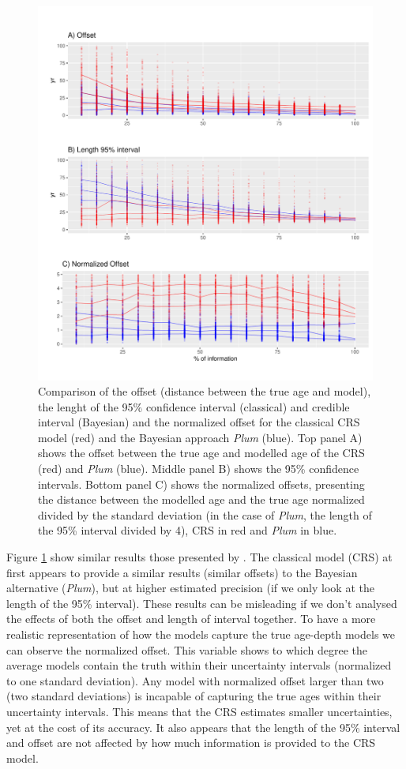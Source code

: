 \documentclass [10pt] {article}
\begin{document}
\begin{figure}[!]
 \centering
  \includegraphics[width=.75\linewidth]{AccPrec.pdf}
	\caption{Comparison of the offset (distance between the true age and model), the lenght of the 95\% confidence interval (classical) and credible interval (Bayesian) and the normalized offset for the classical CRS model (red) and the Bayesian approach \textit{Plum} (blue). Top panel A) shows the offset between the true age and modelled age of the CRS (red) and \textit{Plum} (blue). Middle panel B) shows the 95\% confidence intervals. Bottom panel C) shows the normalized offsets, presenting the distance between the modelled age and the true age normalized divided by the standard deviation (in the case of \textit{Plum}, the length of the 95\% interval divided by 4), CRS in red and \textit{Plum} in blue.    }
  \label{fig:accpre}
\end{figure}

Figure \ref{fig:accpre} show similar results those presented by \citet{Blaauw2018}. 
The classical model (CRS) at first appears to provide a similar results (similar offsets) to the Bayesian alternative (\textit{Plum}), but at higher estimated precision (if we only look at the length of the 95\% interval). 
These results can be misleading if we don't analysed the effects of both the offset and length of interval together. 
To have a more realistic representation of how the models capture the true age-depth models we can observe the normalized offset. 
This variable shows to which degree the average models contain the truth within their uncertainty intervals (normalized to one standard deviation). 
Any model with normalized offset larger than two (two standard deviations) is incapable of capturing the true ages within their uncertainty intervals.  
This means that the CRS estimates smaller uncertainties, yet at the cost of its accuracy.
It also appears that the length of the 95\% interval and offset are not affected by how much information is provided to the CRS model. 
\end{document}
